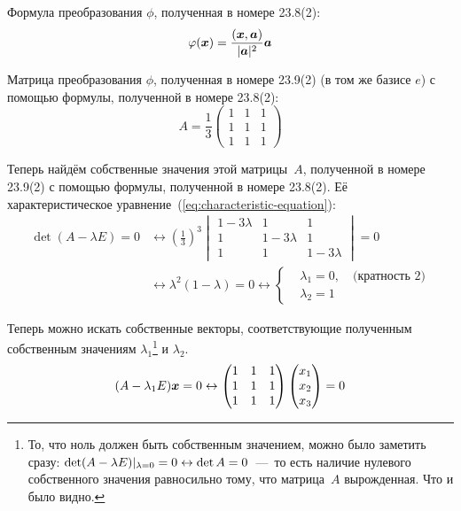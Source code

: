 \documentclass[a4paper,12pt]{article}
\begin{document}
  \begin{solution}
    Формула преобразования $\phi$, полученная в номере 23.8(2):
    \[
      \varphi(\boldsymbol x) = \frac{(\boldsymbol x, \boldsymbol a)}{|\boldsymbol a|^2} \boldsymbol a
    \]
    
    Матрица преобразования $\phi$, полученная в номере 23.9(2) (в том же базисе $e$) с помощью формулы, полученной в номере 23.8(2):
    \[
      A = \frac{1}{3} \begin{pmatrix}
        1 & 1 & 1\\
        1 & 1 & 1\\
        1 & 1 & 1
      \end{pmatrix}
    \]
    
    Теперь найдём собственные значения этой матрицы~$A$, полученной в номере 23.9(2) с помощью формулы, полученной в номере 23.8(2).
    Её характеристическое уравнение~(\ref{eq:characteristic-equation}):
    \begin{equation}
    \begin{split}
      \det(A - \lambda E) = 0
      &\leftrightarrow \left(\frac{1}{3}\right)^3 \begin{vmatrix}
        1 - 3\lambda & 1 & 1\\
        1 & 1 - 3\lambda & 1\\
        1 & 1 & 1 - 3\lambda
      \end{vmatrix} = 0\\
      &\leftrightarrow \lambda^2 (1 - \lambda) = 0
      \leftrightarrow \left\{
        \begin{aligned}
          &\lambda_1 = 0,\quad \mbox{(кратность $2$)}\\
          &\lambda_2 = 1
        \end{aligned}
      \right.
    \end{split}
    \end{equation}
    
    Теперь можно искать собственные векторы, соответствующие полученным собственным значениям $\lambda_1$\footnote{То, что ноль должен быть собственным значением, можно было заметить сразу: $\det (A \hm- \lambda E)|_{\lambda = 0} \hm= 0 \hm\leftrightarrow \det A = 0$~---~то есть наличие нулевого собственного значения равносильно тому, что матрица~$A$ вырожденная. Что и было видно.} и $\lambda_2$.
    \[
      (A - \lambda_1 E) \boldsymbol x = 0
      \leftrightarrow \begin{pmatrix}
        1 & 1 & 1\\
        1 & 1 & 1\\
        1 & 1 & 1
      \end{pmatrix} \begin{pmatrix}
        x_1 \\ x_2 \\ x_3
      \end{pmatrix} = 0
    \]
    

\end{solution}
\end{document}
